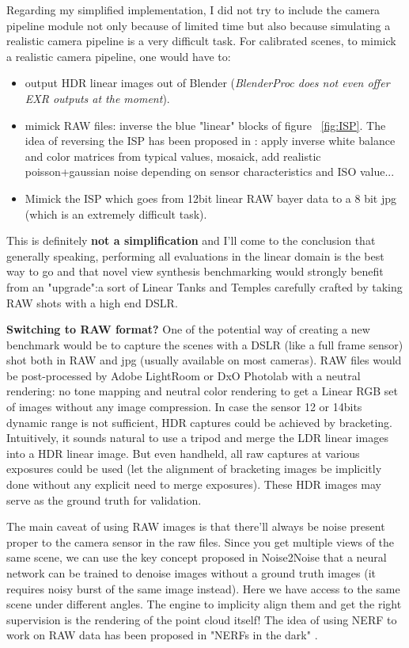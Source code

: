 \noindent Regarding my simplified implementation, I did not try to include the camera pipeline module not only because of limited time but also because simulating a realistic camera pipeline is a very difficult task.
For calibrated scenes, to mimick a realistic camera pipeline, one would have to:
\begin{itemize}
    \item output HDR linear images out of Blender (\textit{BlenderProc does not even offer EXR outputs at the moment}).
    \item mimick RAW files: inverse the blue "linear" blocks of figure ~\cref*{fig:ISP}. The idea of reversing the ISP has been proposed in \cite{brooks2018unprocessing}: apply inverse white balance and color matrices from typical values, mosaick, add realistic poisson+gaussian noise depending on sensor characteristics and ISO value...
    \item Mimick the ISP which goes from 12bit linear RAW bayer data to a 8 bit jpg (which is an extremely difficult task).
\end{itemize}
This is definitely \textbf{not a simplification} and I'll come to the conclusion that generally speaking, performing all evaluations in the linear domain is the best way to go and that novel view synthesis benchmarking would strongly benefit from an "upgrade":a sort of Linear Tanks and Temples carefully crafted by taking RAW shots with a high end DSLR.

\noindent \textbf{Switching to RAW format?} 
One of the potential way of creating a new benchmark would be to capture the scenes with a DSLR (like a full frame sensor) shot both in RAW and jpg (usually available on most cameras). RAW files would be post-processed by Adobe LightRoom or DxO Photolab with a neutral rendering: no tone mapping and neutral color rendering to get a Linear RGB set of images without any image compression. In case the sensor 12 or 14bits dynamic range is not sufficient, HDR captures could be achieved by bracketing. Intuitively, it sounds natural to use a tripod and merge the LDR linear images into a HDR linear image. But even handheld, all raw captures at various exposures could be used (let the alignment of bracketing images be implicitly done without any explicit need to merge exposures). These HDR images may serve as the ground truth for validation.

The main caveat of using RAW images is that there'll always be noise present proper to the camera sensor in the raw files. Since you get multiple views of the same scene, we can use the key concept proposed in Noise2Noise \cite{lehtinen2018noise2noise} that a neural network can be trained to denoise images without a ground truth images (it requires noisy burst of the same image instead). Here we have access to the same scene under different angles. The engine to implicity align them and get the right supervision is the rendering of the point cloud itself! The idea of using NERF to work on RAW data has been proposed in "NERFs in the dark" \cite{mildenhall2022rawnerf}.


